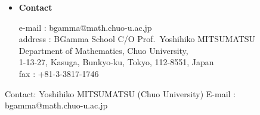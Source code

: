 \documentclass[a4paper]{article}
\newcommand{\bul}{$\bullet$}
\begin{document}
\begin{itemize}
About a 5-minute walk from
EIDAN Subway (TRTA) Marunouchi Line or Nanboku Line Kourakuen Station

About a 7-minute walk from
TOEI Subway Mita Line or O-edo Line Kasuga Station

\href{http://www.chuo-u.ac.jp/chuo-u/access/access_guid.html}
{Click  for the details (in Japanese)}

\item[\bul] {\bf Contact}

e-mail : bgamma@math.chuo-u.ac.jp\\
address : BGamma School C/O Prof.\ Yoshihiko MITSUMATSU\\
\hspace{10mm}Department of Mathematics, Chuo University,\\
\hspace{10mm}1-13-27, Kasuga, Bunkyo-ku, Tokyo, 112-8551, Japan\\
fax : +81-3-3817-1746

\end{itemize}

\hrulefill

\noindent
Contact: Yoshihiko MITSUMATSU (Chuo University)
\quad E-mail : bgamma@math.chuo-u.ac.jp
\end{document}
